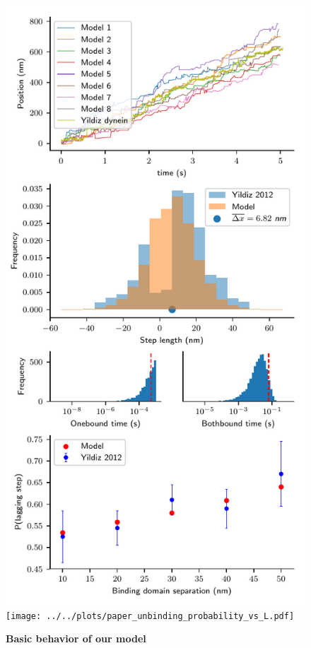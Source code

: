\documentclass[9pt,twocolumn,twoside]{pnas-new}
\begin{document}





\begin{figure}[tbhp]
  \centering
  \includegraphics[width=\linewidth]{../../plots/paper_model_behavior}
  \texttt{[image: ../../plots/paper\_unbinding\_probability\_vs\_L.pdf]}
\caption{\textbf{Basic behavior of our model}}
\label{fig:behavior}
\end{figure}
\end{document}
